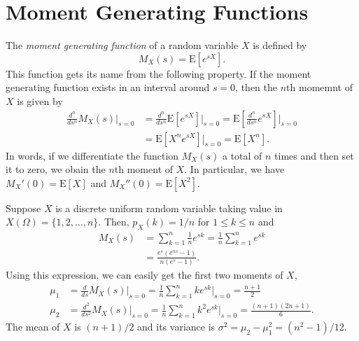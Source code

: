 \section{Moment Generating Functions}

The \emph{moment generating function} of a random variable $X$ is defined by
\begin{equation*}
M_X (s) = \mathrm{E} \left[ e^{s X} \right] .
\end{equation*}
This function gets its name from the following property.
If the moment generating function exists in an interval around $s = 0$, then the $n$th momemnt of $X$ is given by
\begin{equation*}
\begin{split}
\frac{d^n}{ds^n} M_X (s) \Big|_{s=0}
&= \frac{d^n}{ds^n} \mathrm{E} \left[ e^{s X} \right] \Big|_{s=0}
= \mathrm{E} \left[ \frac{d^n}{ds^n} e^{s X} \right] \bigg|_{s=0} \\
&= \mathrm{E} \left[ X^n e^{s X} \right] \Big|_{s=0}
= \mathrm{E} [X^n] .
\end{split}
\end{equation*}
In words, if we differentiate the function $M_X(s)$ a total of $n$ times and then set it to zero, we obain the $n$th moment of $X$.
In particular, we have $M_X'(0) = \mathrm{E} [X]$ and $M_X''(0) = \mathrm{E} [X^2]$.

\begin{example}
Suppose $X$ is a discrete uniform random variable taking value in $X(\Omega) = \{ 1, 2, \ldots, n \}$.
Then, $p_X(k) = 1/n$ for $1 \leq k \leq n$ and
\begin{equation*}
\begin{split}
M_X(s) &= \sum_{k = 1}^n \frac{1}{n} e^{sk}
= \frac{1}{n} \sum_{k = 1}^n e^{sk} \\
&= \frac {e^s (e^{ns} - 1)} {n (e^s - 1)} .
\end{split}
\end{equation*}
Using this expression, we can easily get the first two moments of $X$,
\begin{align*}
\mu_1 &= \frac{d}{ds} M_X (s) \Big|_{s = 0}
= \frac{1}{n} \sum_{k = 1}^n k e^{sk} \Big|_{s = 0} = \frac{n + 1}{2} \\
\mu_2 &= \frac{d^2}{ds^2} M_X (s) \Big|_{s=0}
= \frac{1}{n} \sum_{k=1}^n k^2 e^{sk} \Big|_{s = 0}
= \frac {(n + 1)(2n + 1)}{6} .
\end{align*}
The mean of $X$ is $(n+1)/2$ and its variance is $\sigma^2 = \mu_2 - \mu_1^2 = (n^2 - 1)/12$.
\end{example}

